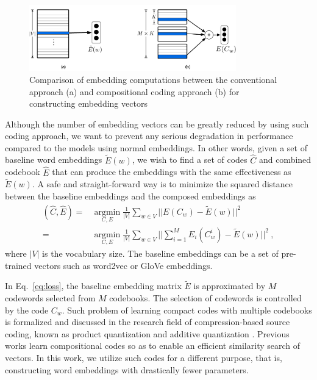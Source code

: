 \documentclass{article} %
\begin{document}
\begin{figure}[t]
  \centering
  \includegraphics[width=0.80\textwidth]{figures/code}
  \caption{Comparison of embedding computations between the conventional approach (a) and compositional coding approach (b) for constructing embedding vectors }
  \label{fig:code}
\end{figure}



Although the number of embedding vectors can be greatly reduced by using such coding approach, we want to prevent any serious degradation in performance compared to the models using normal embeddings. In other words, given a set of baseline word embeddings $\tilde E(w)$, we wish to find a set of codes $\hat C$ and combined codebook $\hat E$ that can produce the embeddings with the same effectiveness as $\tilde E(w)$. A safe and straight-forward way is to minimize the squared distance between the baseline embeddings and the composed embeddings as
\begin{align}
    (\hat C, \hat E) =& \mathop{\mbox{argmin}}\limits_{C, E} \frac{1}{|V|} \sum_{w \in V} || E(C_w) - \tilde E(w) ||^2  \label{eq:loss} \\
    =& \mathop{\mbox{argmin}}\limits_{C, E} \frac{1}{|V|} \sum_{w \in V} || \sum_{i=1}^M E_i(C_w^i) - \tilde E(w) ||^2 \:,
\end{align}
where $|V|$ is the vocabulary size. The baseline embeddings can be a set of pre-trained vectors such as word2vec \citep{Mikolov2013DistributedRO} or GloVe \citep{pennington2014GloVe} embeddings.

In Eq.~\ref{eq:loss}, the baseline embedding matrix ${\tilde E}$ is approximated by $M$ codewords selected from $M$ codebooks. The selection of codewords is controlled by the code $C_w$. Such problem of learning compact codes with multiple codebooks is formalized and discussed in the research field of compression-based source coding, known as product quantization \citep{Jgou2011ProductQF} and additive quantization \citep{Babenko2014AdditiveQF,Martinez2016RevisitingAQ}. Previous works learn compositional codes so as to enable an efficient similarity search of vectors. In this work, we utilize such codes for a different purpose, that is, constructing word embeddings with drastically fewer parameters.
\end{document}
